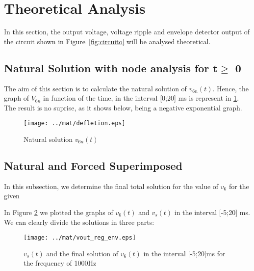 \section{Theoretical Analysis}
\label{sec:analysis}

\hspace{0,5cm} In this section, the output voltage, voltage ripple and envelope detector output of the circuit shown in Figure~\ref{fig:circuito} will be analysed theoretical.


\subsection{Natural Solution with node analysis for t$\geq$ 0}
The aim of this section is to calculate the natural solution of $v_{6n} (t)$. 
Hence, the graph of $V_{6n}$ in function of the time, in the interval [0;20] ms is represent in \ref{fig:mat3}. The result is no suprise, as it shows below, being a negative exponential graph.

\begin{figure}[H] \centering
\texttt{[image: ../mat/defletion.eps]}
\caption{Natural solution $v_{6n} (t)$} 
\label{fig:mat3}
\end{figure}


\subsection{Natural and Forced Superimposed}
In this subsection, we determine the final total solution for the value of $v_6$ for the given 

In Figure \ref{fig:mat4} we plotted the graphs of $v_6(t)$ and $v_s(t)$ in the interval [-5;20] ms. We can clearly divide the solutions in three parts:


\begin{figure}[H] \centering
\texttt{[image: ../mat/vout\_reg\_env.eps]}
\caption{$v_s(t)$ and the final solution of $v_6(t)$ in the interval [-5;20]ms for the frequency of 1000Hz}
\label{fig:mat4}
\end{figure}





